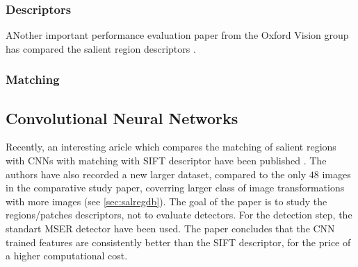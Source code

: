 \subsubsection{Descriptors}
ANother important performance evaluation paper from the Oxford Vision group has compared the salient region descriptors \cite{}. 
\subsubsection{Matching}

\subsection{Convolutional Neural Networks}

Recently, an interesting aricle which compares the matching of salient regions  with CNNs with matching with SIFT descriptor have been published \cite{FischerDB14}. The authors have also recorded a new larger dataset, compared to the only $48$ images in the comparative study paper, coverring larger class of image transformations with more images (see \ref{sec:salregdb}). The goal of the paper is to study the regions/patches descriptors, not to evaluate detectors. For the detection step, the standart MSER detector have been used. The paper concludes that the CNN trained features are consistently better than the SIFT descriptor, for the price of a higher computational cost.